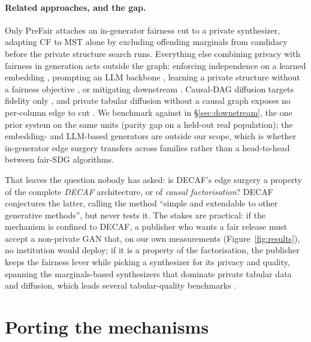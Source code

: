 \documentclass{article}
\begin{document}
\paragraph{Related approaches, and the gap.}
Only PreFair \citep{pujol2023prefair} attaches an in-generator fairness cut to
a private synthesizer, adapting CF to MST alone by excluding offending
marginals from candidacy before the private structure search runs. Everything
else combining privacy with fairness in generation acts outside the graph:
enforcing independence on a learned embedding
\citep{hyrup2025flip,sarmin2025pfwgan}, prompting an LLM backbone
\citep{nagesh2025faircausesyn}, learning a private structure without a
fairness objective \citep{jia2025pradagan}, or mitigating downstream
\citep{angelozzi2026where}. Causal-DAG diffusion targets fidelity only
\citep{zhang2025causaldifftab,jacob2026tabscm}, and private tabular diffusion
without a causal graph exposes no per-column edge to cut
\citep{zhu2024dptldm}. We benchmark against \citet{angelozzi2026where} in
\S\ref{sec:downstream}, the one prior system on the same units (parity gap on
a held-out real population); the embedding- and LLM-based generators are
outside our scope, which is whether in-generator edge surgery transfers across
families rather than a head-to-head between fair-SDG algorithms.

That leaves the question nobody has asked: is DECAF's edge surgery a property
of the complete \emph{DECAF} architecture, or of \emph{causal factorisation}?
DECAF conjectures the latter, calling the method ``simple and extendable to
other generative methods'', but never tests it. The stakes are practical: if
the mechanism is confined to DECAF, a publisher who wants a fair release must
accept a non-private GAN that, on our own measurements
(Figure~\ref{fig:results}), no institution would deploy; if it is a property
of the factorisation, the publisher keeps the fairness lever while picking a
synthesizer for its privacy and quality, spanning the marginals-based
synthesizers that dominate private tabular data
\citep{mckenna2021mst,zhang2014privbayes,zhang2021privsyn} and diffusion,
which leads several tabular-quality benchmarks \citep{kotelnikov2023tabddpm}.

\section{Porting the mechanisms}
\label{sec:method}
\end{document}
